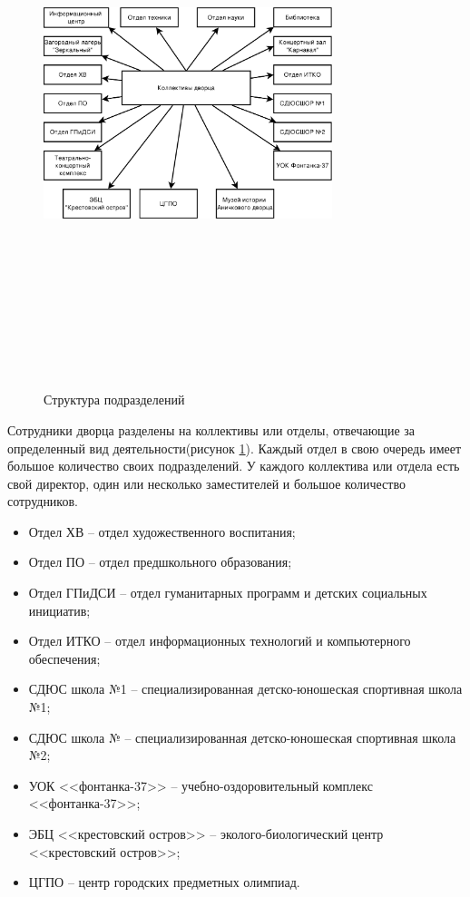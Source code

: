 \documentclass[utf8,usehyperref,12pt]{G7-32}
\begin{document}
\begin{figure}[ht]
   \centering%
   \includegraphics[height=160mm, width=0.75\textwidth, clip, keepaspectratio]{pictures/org_struct}
   \caption{Структура подразделений}\label{fig:org_structure}
 \end{figure}

Сотрудники дворца разделены на коллективы или отделы, отвечающие за определенный вид деятельности(рисунок \ref{fig:org_structure}).
Каждый отдел в свою очередь имеет большое количество своих подразделений. У каждого коллектива или отдела есть свой директор, один или несколько заместителей и большое количество сотрудников.

\begin{itemize}
\item Отдел ХВ – отдел художественного воспитания;
\item Отдел ПО – отдел предшкольного  образования;
\item Отдел ГПиДСИ – отдел гуманитарных программ и детских социальных инициатив;
\item Отдел ИТКО – отдел информационных технологий и компьютерного обеспечения;
\item СДЮС школа №1 – специализированная детско-юношеская спортивная школа №1;
\item СДЮС школа № – специализированная детско-юношеская спортивная школа №2;
\item УОК <<фонтанка-37>> – учебно-оздоровительный комплекс <<фонтанка-37>>;
\item ЭБЦ <<крестовский остров>> – эколого-биологический центр <<крестовский остров>>;
\item ЦГПО – центр городских предметных олимпиад.
\end{itemize}
\end{document}

